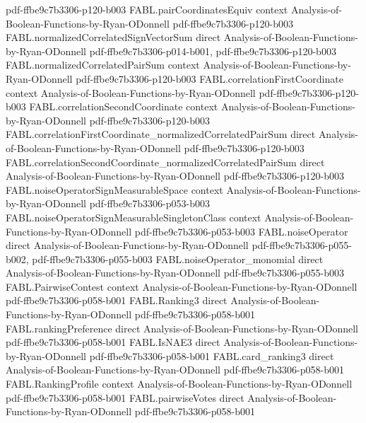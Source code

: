 \begin{theorem}
  {pdf-ffbe9c7b3306-p120-b003}
\proofstep
  {FABL.pairCoordinatesEquiv}
  {context}
  {Analysis-of-Boolean-Functions-by-Ryan-ODonnell}
  {pdf-ffbe9c7b3306-p120-b003}
\proofstep
  {FABL.normalizedCorrelatedSignVectorSum}
  {direct}
  {Analysis-of-Boolean-Functions-by-Ryan-ODonnell}
  {pdf-ffbe9c7b3306-p014-b001,
    pdf-ffbe9c7b3306-p120-b003}
\proofstep
  {FABL.normalizedCorrelatedPairSum}
  {context}
  {Analysis-of-Boolean-Functions-by-Ryan-ODonnell}
  {pdf-ffbe9c7b3306-p120-b003}
\proofstep
  {FABL.correlationFirstCoordinate}
  {context}
  {Analysis-of-Boolean-Functions-by-Ryan-ODonnell}
  {pdf-ffbe9c7b3306-p120-b003}
\proofstep
  {FABL.correlationSecondCoordinate}
  {context}
  {Analysis-of-Boolean-Functions-by-Ryan-ODonnell}
  {pdf-ffbe9c7b3306-p120-b003}
\proofstep
  {FABL.correlationFirstCoordinate_normalizedCorrelatedPairSum}
  {direct}
  {Analysis-of-Boolean-Functions-by-Ryan-ODonnell}
  {pdf-ffbe9c7b3306-p120-b003}
\proofstep
  {FABL.correlationSecondCoordinate_normalizedCorrelatedPairSum}
  {direct}
  {Analysis-of-Boolean-Functions-by-Ryan-ODonnell}
  {pdf-ffbe9c7b3306-p120-b003}
\proofstep
  {FABL.noiseOperatorSignMeasurableSpace}
  {context}
  {Analysis-of-Boolean-Functions-by-Ryan-ODonnell}
  {pdf-ffbe9c7b3306-p053-b003}
\proofstep
  {FABL.noiseOperatorSignMeasurableSingletonClass}
  {context}
  {Analysis-of-Boolean-Functions-by-Ryan-ODonnell}
  {pdf-ffbe9c7b3306-p053-b003}
\proofstep
  {FABL.noiseOperator}
  {direct}
  {Analysis-of-Boolean-Functions-by-Ryan-ODonnell}
  {pdf-ffbe9c7b3306-p055-b002,
    pdf-ffbe9c7b3306-p055-b003}
\proofstep
  {FABL.noiseOperator_monomial}
  {direct}
  {Analysis-of-Boolean-Functions-by-Ryan-ODonnell}
  {pdf-ffbe9c7b3306-p055-b003}
\proofstep
  {FABL.PairwiseContest}
  {context}
  {Analysis-of-Boolean-Functions-by-Ryan-ODonnell}
  {pdf-ffbe9c7b3306-p058-b001}
\proofstep
  {FABL.Ranking3}
  {direct}
  {Analysis-of-Boolean-Functions-by-Ryan-ODonnell}
  {pdf-ffbe9c7b3306-p058-b001}
\proofstep
  {FABL.rankingPreference}
  {direct}
  {Analysis-of-Boolean-Functions-by-Ryan-ODonnell}
  {pdf-ffbe9c7b3306-p058-b001}
\proofstep
  {FABL.IsNAE3}
  {direct}
  {Analysis-of-Boolean-Functions-by-Ryan-ODonnell}
  {pdf-ffbe9c7b3306-p058-b001}
\proofstep
  {FABL.card_ranking3}
  {direct}
  {Analysis-of-Boolean-Functions-by-Ryan-ODonnell}
  {pdf-ffbe9c7b3306-p058-b001}
\proofstep
  {FABL.RankingProfile}
  {context}
  {Analysis-of-Boolean-Functions-by-Ryan-ODonnell}
  {pdf-ffbe9c7b3306-p058-b001}
\proofstep
  {FABL.pairwiseVotes}
  {direct}
  {Analysis-of-Boolean-Functions-by-Ryan-ODonnell}
  {pdf-ffbe9c7b3306-p058-b001}
\proofstep

\end{theorem}
